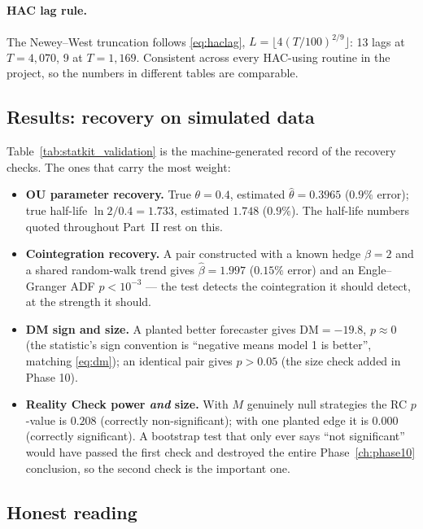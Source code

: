 \paragraph{HAC lag rule.} The Newey--West truncation follows \eqref{eq:haclag},
$L=\lfloor4(T/100)^{2/9}\rfloor$: 13 lags at $T=4{,}070$, 9 at $T=1{,}169$. Consistent
across every HAC-using routine in the project, so the numbers in different tables are
comparable.

\subsection{Results: recovery on simulated data}



Table~\ref{tab:statkit_validation} is the machine-generated record of the recovery
checks. The ones that carry the most weight:

\begin{itemize}
  \item \textbf{OU parameter recovery.} True $\theta=0.4$, estimated $\hat\theta=0.3965$
    ($0.9\%$ error); true half-life $\ln2/0.4=1.733$, estimated $1.748$ ($0.9\%$). The
    half-life numbers quoted throughout Part~II rest on this.
  \item \textbf{Cointegration recovery.} A pair constructed with a known hedge
    $\beta=2$ and a shared random-walk trend gives $\hat\beta=1.997$ ($0.15\%$ error) and
    an Engle--Granger ADF $p<10^{-3}$ --- the test detects the cointegration it should
    detect, at the strength it should.
  \item \textbf{DM sign and size.} A planted better forecaster gives $\mathrm{DM}=-19.8$,
    $p\approx0$ (the statistic's sign convention is ``negative means model 1 is better'',
    matching \eqref{eq:dm}); an identical pair gives $p>0.05$ (the size check added in
    Phase 10).
  \item \textbf{Reality Check power \emph{and} size.} With $M$ genuinely null strategies
    the RC $p$-value is $0.208$ (correctly non-significant); with one planted edge it is
    $0.000$ (correctly significant). A bootstrap test that only ever says ``not
    significant'' would have passed the first check and destroyed the entire
    Phase~\ref{ch:phase10} conclusion, so the second check is the important one.
\end{itemize}

\subsection{Honest reading}

